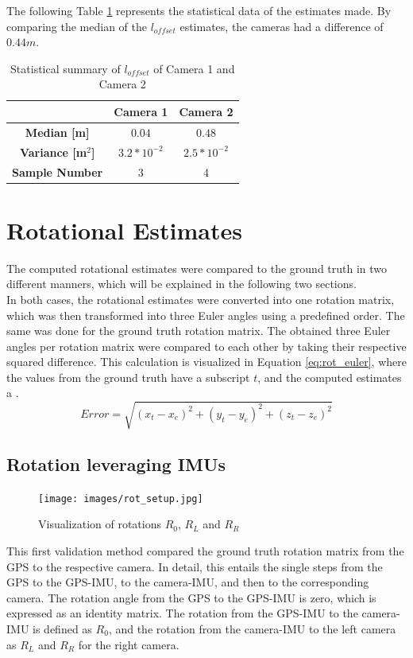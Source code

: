 The following Table \ref{tab:stats_long} represents the statistical data of the estimates made. By comparing the median of the $l_{offset}$ estimates, the cameras had a difference of $0.44m$.

\begin{table}[h!]
\centering
\begin{tabular}{c c c}
  & \textbf{Camera 1} & \textbf{Camera 2} \\
\midrule
\textbf{Median [m] } & $0.04$ & $0.48$ \\
\textbf{Variance [m$^2$]} &  $3.2 * 10^{-2}$ & $2.5 * 10^{-2}$ \\
\textbf{Sample Number} & 3 & 4 \\
\bottomrule
\end{tabular}
\caption{Statistical summary of $l_{offset}$ of Camera 1 and Camera 2}
\label{tab:stats_long}
\end{table}






\newpage
\section{Rotational Estimates}
The computed rotational estimates were compared to the ground truth in two different manners, which will be explained in the following two sections.\\

In both cases, the rotational estimates were converted into one rotation matrix, which was then transformed into three Euler angles using a predefined order. The same was done for the ground truth rotation matrix. The obtained three Euler angles per rotation matrix were compared to each other by taking their respective squared difference. This calculation is visualized in Equation \ref{eq:rot_euler}, where the values from the ground truth have a subscript $t$, and the computed estimates a . 
 \begin{equation}
Error = \sqrt{(x_t - x_e)^2 + (y_t - y_e)^2 +(z_t-z_e) ^2}
\label{eq:rot_euler}
\end{equation}


\subsection{Rotation leveraging IMUs}
\begin{figure}[h!]
   \centering
   \texttt{[image: images/rot\_setup.jpg]}
   \caption{Visualization of rotations $R_0$, $R_L$ and $R_R$}
   \label{pics:rotsetup}
\end{figure}
This first validation method compared the ground truth rotation matrix from the GPS to the respective camera. In detail, this entails the single steps from the GPS to the GPS-IMU, to the camera-IMU, and then to the corresponding camera. The rotation angle from the GPS to the GPS-IMU is zero, which is expressed as an identity matrix. The rotation from the GPS-IMU to the camera-IMU is defined as $R_0$, and the rotation from the camera-IMU to the left camera as $R_L$ and $R_R$ for the right camera.

